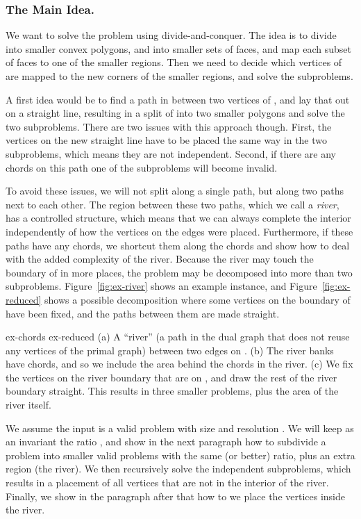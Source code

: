 \documentclass[11pt]{article}
\newif\ifFull
\renewcommand{\subsection}[1]{\subsubsection{#1.}}
\begin{document}
  \subsection {The Main Idea}

    We want to solve the problem using divide-and-conquer.
    The idea is to divide  into smaller convex polygons, and  into smaller
    sets of faces, and map each subset of faces to one of the smaller regions.
    Then we need to decide which vertices of  are mapped to the new corners
    of the smaller regions, and solve the subproblems.

    A first idea would be
    to find a path in  between two vertices of , and lay that out on a
    straight line, resulting in a split of  into two smaller polygons and solve
    the two subproblems. There are two issues with this approach though. First, the
    vertices on the new straight line have to be placed the same way in the two
    subproblems, which means they are not independent. Second, if there are any
    chords on this path one of the subproblems will become invalid.

    To avoid these issues, we will not split along a single path, but along two
    paths next to each other. The region between these two paths, which we call a
    \emph {river}, has a controlled structure, which means that we can always
    complete the interior independently of how the vertices on the edges were
    placed. Furthermore, if these paths have any chords, we shortcut them along
    the chords and show how to deal with the added complexity of the river.
    Because the river may touch the boundary of  in more places, the problem
    may be decomposed into more than two subproblems.
    Figure~\ref {fig:ex-river} shows an example instance,
    and Figure~\ref {fig:ex-reduced} shows
    a possible decomposition where some vertices on the boundary of  have been
    fixed, and the paths between them are made straight.

     {ex-chords} {ex-reduced}
    {(a) A ``river'' (a path in the dual graph that does not reuse any vertices of
    the primal graph) between two edges on . (b) The river banks have chords, and so 
    we include the area behind the chords in the river. (c) We fix the vertices on
    the river boundary that are on , and draw the rest of the river boundary
    straight. This results in three smaller problems, plus the area of the river
    itself.}

    We assume the input is a valid problem with size  and resolution .
    We will keep as an invariant the ratio , and show in
    \ifFull Section~\ref {sec:split} \else the next paragraph \fi
    how to
    subdivide a problem into smaller valid problems with the same (or better)
    ratio, plus an extra region (the river). We then recursively solve the
    independent subproblems, which results in a placement of all vertices
    that are not in the interior of the river. Finally, we show in
    \ifFull Section~\ref {sec:river} \else the paragraph after that \fi
    how to we place the vertices inside the river.
\end{document}
